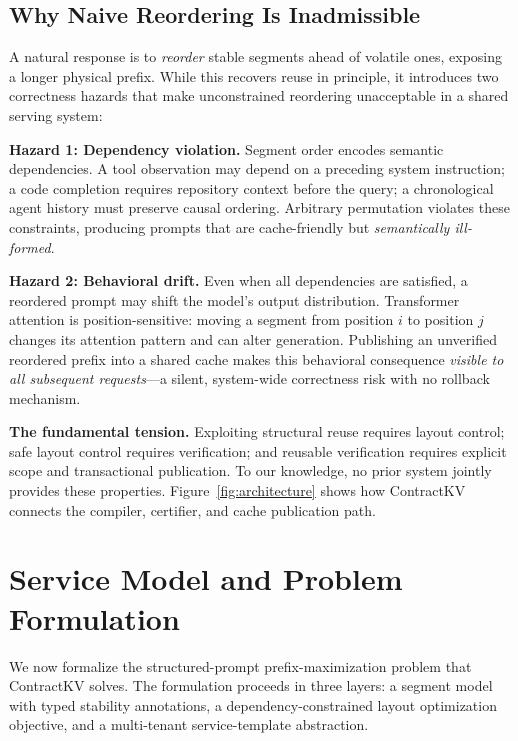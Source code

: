 \documentclass[journal]{IEEEtran}
\begin{document}
\subsection{Why Naive Reordering Is Inadmissible}

A natural response is to \emph{reorder} stable segments ahead of volatile ones, exposing a longer physical prefix. While this recovers reuse in principle, it introduces two correctness hazards that make unconstrained reordering unacceptable in a shared serving system:

\smallskip
\noindent\textbf{Hazard 1: Dependency violation.}
Segment order encodes semantic dependencies. A tool observation may depend on a preceding system instruction; a code completion requires repository context before the query; a chronological agent history must preserve causal ordering. Arbitrary permutation violates these constraints, producing prompts that are cache-friendly but \emph{semantically ill-formed}.

\smallskip
\noindent\textbf{Hazard 2: Behavioral drift.}
Even when all dependencies are satisfied, a reordered prompt may shift the model's output distribution. Transformer attention is position-sensitive: moving a segment from position $i$ to position $j$ changes its attention pattern and can alter generation. Publishing an unverified reordered prefix into a shared cache makes this behavioral consequence \emph{visible to all subsequent requests}---a silent, system-wide correctness risk with no rollback mechanism.

\smallskip
\noindent\textbf{The fundamental tension.}
Exploiting structural reuse requires layout control; safe layout control requires verification; and reusable verification requires explicit scope and transactional publication. To our knowledge, no prior system jointly provides these properties. Figure~\ref{fig:architecture} shows how ContractKV connects the compiler, certifier, and cache publication path.

\section{Service Model and Problem Formulation}
\label{sec:formulation}

We now formalize the structured-prompt prefix-maximization problem that ContractKV solves. The formulation proceeds in three layers: a segment model with typed stability annotations, a dependency-constrained layout optimization objective, and a multi-tenant service-template abstraction.
\end{document}
